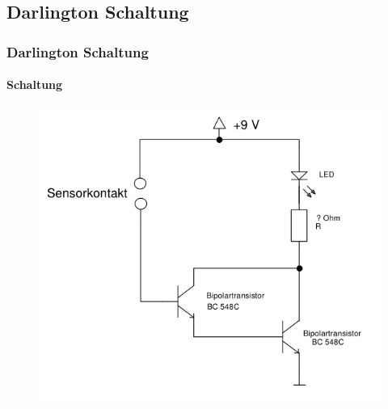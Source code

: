 \subsection{Darlington Schaltung} %
\label{sub:Darlington_Schaltung}
\begin{frame}
    \frametitle{Darlington Schaltung}
    \framesubtitle{Schaltung}
    \begin{figure}[H]
    \begin{center}
            \includegraphics[scale=0.4]{./img/schaltungen/darlington.png}
    \end{center}
    \end{figure}
\end{frame}
